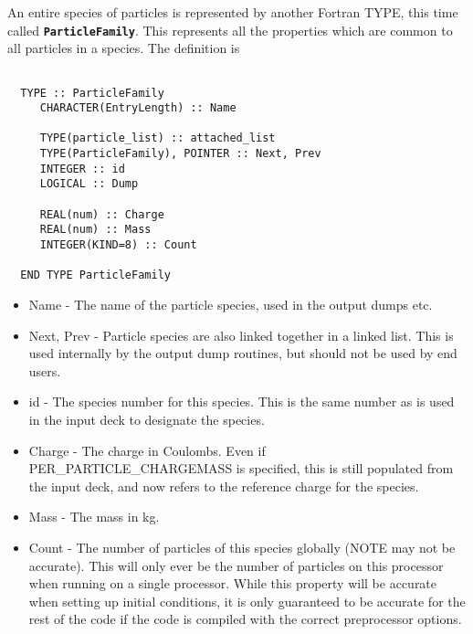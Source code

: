 \documentclass[12pt,a4paper]{article}
\newcommand{\simpleboxverbatim}{\begin{Verbatim}[obeytabs=true,frame=single,
  framerule=0.5mm,rulecolor=\color{warwickmid},formatcom=\color{black}]}
\newcommand{\inlinecode}[1]{{\color{warwickred} \bf\texttt{#1}}}
\begin{document}
An entire species of particles is represented by another Fortran TYPE, this
time called \inlinecode{ParticleFamily}. This represents all the properties
which are common to all particles in a species. The definition is

\simpleboxverbatim

  TYPE :: ParticleFamily
     CHARACTER(EntryLength) :: Name

     TYPE(particle_list) :: attached_list
     TYPE(ParticleFamily), POINTER :: Next, Prev
     INTEGER :: id
     LOGICAL :: Dump

     REAL(num) :: Charge
     REAL(num) :: Mass
     INTEGER(KIND=8) :: Count

  END TYPE ParticleFamily

\end{Verbatim}

\begin{itemize}
\item Name - The name of the particle species, used in the output dumps etc.
\item Next, Prev - Particle species are also linked together in a linked
  list. This is used internally by the output dump routines, but should not be
  used by end users.
\item id - The species number for this species. This is the same number as is
  used in the input deck to designate the species.
\item Charge - The charge in Coulombs. Even if PER\_PARTICLE\_CHARGEMASS is
  specified, this is still populated from the input deck, and now refers to
  the reference charge for the species.
\item Mass - The mass in kg.
\item Count - The number of particles of this species globally (NOTE may not
  be accurate). This will only ever be the number of particles on this
  processor when running on a single processor. While this property will be
  accurate when setting up initial conditions, it is only guaranteed to be
  accurate for the rest of the code if the code is compiled with the correct
  preprocessor options.
\end{itemize}
\end{document}
